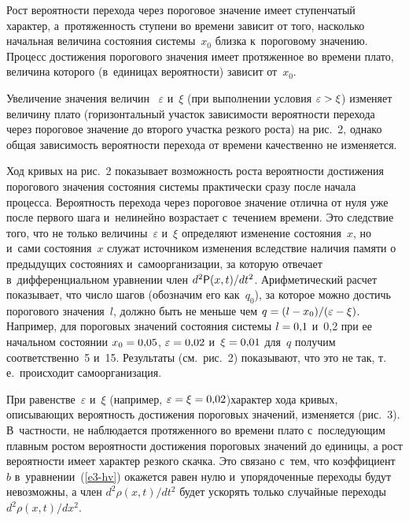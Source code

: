 \begin{multicols}{2}
  Рост вероятности перехода через пороговое значение имеет ступенчатый 
характер, а~про\-тя\-жен\-ность ступени во времени зависит от того, насколько 
начальная величина со\-сто\-яния сис\-те\-мы~$x_0$
 \mbox{близка} к~пороговому значению. 
Процесс достижения порогового значения имеет протяженное во времени 
плато, величина которого (в~единицах ве\-ро\-ят\-ности) зависит от~$x_0$.
  
  Увеличение значения величин ~$\varepsilon$ и~$\xi$ (при выполнении 
условия $\varepsilon \hm >\xi$) изменяет величину плато (горизонтальный 
участок зависимости ве\-ро\-ят\-ности перехода через пороговое значение до 
\mbox{второго} участка резкого рос\-та) на рис.~2, однако общая за\-ви\-си\-мость 
ве\-ро\-ят\-ности перехода от времени качественно не изменяется.
  
  Ход кривых на рис.~2 показывает возможность роста вероятности 
достижения порогового значения состояния системы практически сразу после 
начала процесса. Вероятность перехода через пороговое значение отлична от 
нуля уже после первого шага и~нелинейно возрастает с~течением времени. Это 
следствие того, что не только величины~$\varepsilon$ и~$\xi$ определяют 
изменение состояния~$x$, но и~сами состояния~$x$ служат источником изменения 
вследствие наличия памяти о предыдущих состояниях и~самоорганизации, за 
которую отвечает в~дифференциальном уравнении член $d^2 {\sf P}(x,t)/dt^2$. 
Арифметический расчет показывает, что число шагов (обозначим его 
как~$q_0$), за которое можно достичь порогового значения~$l$, должно быть 
не меньше чем $q\hm=(l\hm - x_0)/(\varepsilon \hm - \xi)$. Например, для 
пороговых значений состояния системы $l\hm=0{,}1$ и~0,2 при ее начальном 
состоянии $x_0\hm=0{,}05$, $\varepsilon\hm=0{,}02$ и~$\xi\hm=0{,}01$ 
для~$q$ получим соответственно~5 и~15. Результаты (см.\ рис.~2) показывают, 
что это не так, т.\,е.\ происходит самоорганизация.
  
  При равенстве~$\varepsilon$ и~$\xi$ (например, 
$\varepsilon\hm=\xi\hm=0{,}02$)\linebreak характер хода кривых, описывающих 
вероятность достижения пороговых значений, изменяется (рис.~3).  
В~част\-ности, не наблюдается протяженного во времени плато 
с~последующим плавным ростом вероятности достижения пороговых значений 
до единицы, а рост вероятности имеет характер резкого скачка. Это связано 
с~тем, что коэффициент~$b$ в~уравнении~(\ref{e3-hv}) окажется равен нулю 
и~упорядоченные переходы будут невозможны, а член $d^2\rho(x,t)/dt^2$ будет 
ускорять только случайные переходы $d^2\rho(x,t)/dx^2$.


\end{multicols}
